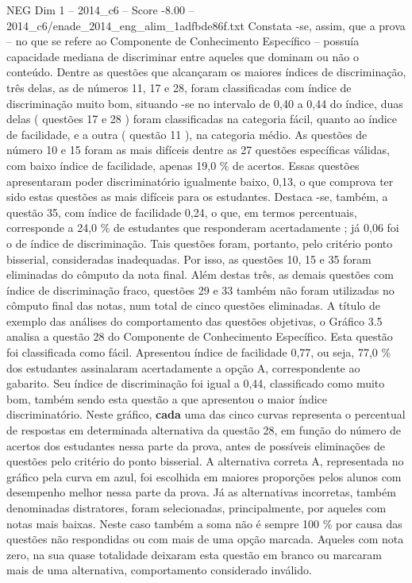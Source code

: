 \begin{textsample}{NEG Dim 1 – 2014\_c6 – Score -8.00 – 2014\_c6/enade\_2014\_eng\_alim\_1adfbde86f.txt}
Constata -se, assim, que a prova – no que se refere ao Componente de Conhecimento Específico – possuía capacidade mediana de discriminar entre aqueles que dominam ou não o conteúdo.
Dentre as questões que alcançaram os maiores índices de discriminação, três delas, as de números 11, 17 e 28, foram classificadas com índice de discriminação muito bom, situando -se no intervalo de 0,40 a 0,44 do índice, duas delas ( questões 17 e 28 ) foram classificadas na categoria fácil, quanto ao índice de facilidade, e a outra ( questão 11 ), na categoria médio.
As questões de número 10 e 15 foram as mais difíceis dentre as 27 questões específicas válidas, com baixo índice de facilidade, apenas 19,0 \% de acertos.
Essas questões apresentaram poder discriminatório igualmente baixo, 0,13, o que comprova ter sido estas questões as mais difíceis para os estudantes.
Destaca -se, também, a questão 35, com índice de facilidade 0,24, o que, em termos percentuais, corresponde a 24,0 \% de estudantes que responderam acertadamente ; já 0,06 foi o de índice de discriminação.
Tais questões foram, portanto, pelo critério ponto bisserial, consideradas inadequadas.
Por isso, as questões 10, 15 e 35 foram eliminadas do cômputo da nota final.
Além destas três, as demais questões com índice de discriminação fraco, questões 29 e 33 também não foram utilizadas no cômputo final das notas, num total de cinco questões eliminadas.
A título de exemplo das análises do comportamento das questões objetivas, o Gráfico 3.5 analisa a questão 28 do Componente de Conhecimento Específico.
Esta questão foi classificada como fácil.
Apresentou índice de facilidade 0,77, ou seja, 77,0 \% dos estudantes assinalaram acertadamente a opção A, correspondente ao gabarito.
Seu índice de discriminação foi igual a 0,44, classificado como muito bom, também sendo esta questão a que apresentou o maior índice discriminatório.
Neste gráfico, \textbf{cada} uma das cinco curvas representa o percentual de respostas em determinada alternativa da questão 28, em função do número de acertos dos estudantes nessa parte da prova, antes de possíveis eliminações de questões pelo critério do ponto bisserial.
A alternativa correta A, representada no gráfico pela curva em azul, foi escolhida em maiores proporções pelos alunos com desempenho melhor nessa parte da prova.
Já as alternativas incorretas, também denominadas distratores, foram selecionadas, principalmente, por aqueles com notas mais baixas.
Neste caso também a soma não é sempre 100 \% por causa das questões não respondidas ou com mais de uma opção marcada.
Aqueles com nota zero, na sua quase totalidade deixaram esta questão em branco ou marcaram mais de uma alternativa, comportamento considerado inválido.

\end{textsample}
